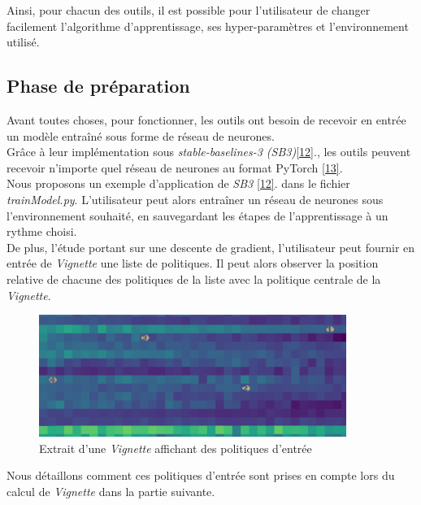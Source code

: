 \documentclass[12pt]{article}
\begin{document}
Ainsi, pour chacun des outils, il est possible pour l’utilisateur de changer facilement l’algorithme d’apprentissage, ses hyper-paramètres et l’environnement utilisé. \\

\subsection{Phase de préparation}

Avant toutes choses, pour fonctionner, les outils ont besoin de recevoir en entrée un modèle entraîné sous forme de réseau de neurones. \\

Grâce à leur implémentation sous \emph{stable-baselines-3 (SB3)}\href{https://stable-baselines.readthedocs.io/en/master/   }{[12]}., les outils peuvent recevoir n'importe quel réseau de neurones au format PyTorch \href{https://pytorch.org/  }{[13]}. \\

Nous proposons un exemple d'application de \emph{SB3} \href{https://stable-baselines.readthedocs.io/en/master/   }{[12]}.
 dans le fichier \emph{trainModel.py}. L'utilisateur peut alors entraîner un réseau de neurones sous l'environnement souhaité, en sauvegardant les étapes de l'apprentissage à un rythme choisi. \\

De plus, l'étude portant sur une descente de gradient, l'utilisateur peut fournir en entrée de \emph{Vignette} une liste de politiques. Il peut alors observer la position relative de chacune des politiques de la liste avec la politique centrale de la \emph{Vignette}. \\

\begin{figure}[htp]
    \centering
    \includegraphics[width=10cm]{Images/politiques_entrees_vignette}
    \caption{Extrait d'une \emph{Vignette} affichant des politiques d'entrée}
    \label{fig:exempleEntree}
\end{figure}

Nous détaillons comment ces politiques d'entrée sont prises en compte lors du calcul de \emph{Vignette} dans la partie suivante. \\
\end{document}
